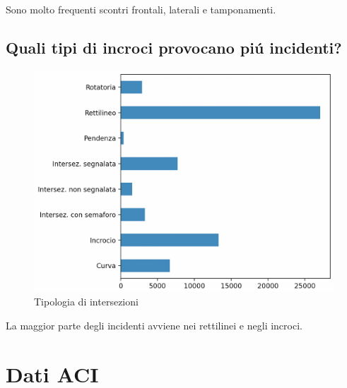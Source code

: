 \documentclass[a4paper]{report}
\begin{document}
Sono molto frequenti scontri frontali, laterali e tamponamenti.

\newpage
\subsection{Quali tipi di incroci provocano pi\'u incidenti?}

\begin{figure}[!ht]
    \includegraphics[width=\linewidth]{../src/incidenti/incidenti_senza_coords/localizzazione_incidente/intersezioni.png}
    \caption{Tipologia di intersezioni}
    \label{fig:tipo_intersezioni}
\end{figure}

La maggior parte degli incidenti avviene nei rettilinei e negli incroci.




\newpage
\section{Dati ACI}

\newpage
\end{document}
